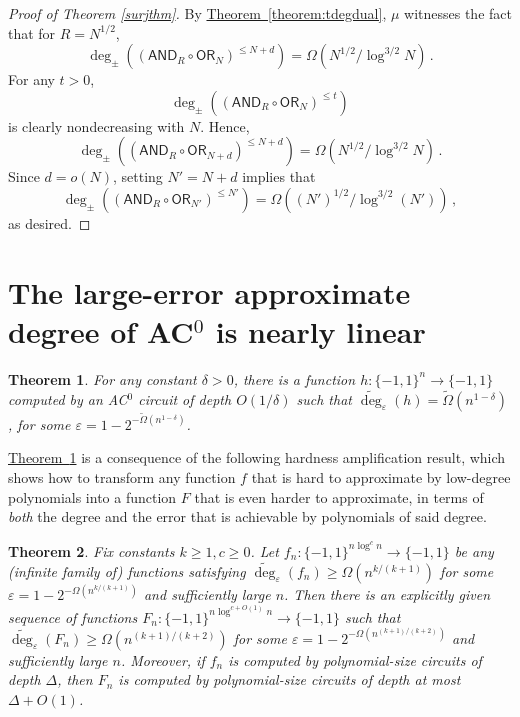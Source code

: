 \documentclass[11pt]{article}
\numberwithin{equation}{section}
\newtheorem{theorem}{Theorem}[section]
\theoremstyle{definition}
\theoremstyle{plain}
\newcommand{\expref}[2]{\hyperref[#2]{#1~\ref{#2}}}
\newcommand{\OR}{\mathsf{ OR}}
\newcommand{\bits}{\{-1,1\}}
\newcommand{\eps}{\varepsilon}
\newcommand{\adeg}{\widetilde{\operatorname{deg}}}
\newcommand{\AND}{\mathsf{AND}}
\begin{document}
\begin{proof}[Proof of Theorem \ref{surjthm}]
	By \expref{Theorem}{theorem:tdegdual}, $\mu$ witnesses the fact that for $R=N^{1/2}$,
%
%
\[\deg_{\pm}\left(\left(\AND_R \circ \OR_N\right)^{\leq N+d}\right) =
\Omega\left(N^{1/2}/\log^{3/2} N\right)\,.\]
For any $t > 0$,
%
\[ \deg_{\pm}\left(\left(\AND_R \circ \OR_N\right)^{\leq t}\right) \]
is clearly nondecreasing with $N$. Hence, 
%
%
\[ \deg_{\pm}\left(\left(\AND_R \circ \OR_{N+d}\right)^{\leq N+d}\right) = \Omega\left(N^{1/2}/\log^{3/2} N\right) \,.\]
Since $d=o(N)$, setting $N'=N+d$ implies that
%
%
\[ \deg_{\pm}\left(\left(\AND_R \circ \OR_{N'}\right)^{\leq N'}\right)
 = \Omega\left((N')^{1/2}/\log^{3/2}(N')\right)\,,\]
as desired.  %
\end{proof}

\section{The large-error approximate degree of
  \texorpdfstring{AC$^0$}{AC0} is nearly linear}
\label{s:discproof}
\begin{theorem} \label{ac0thm}
	For any constant $\delta > 0$, there is a function $h \colon \bits^n \to \bits$ computed
	by an AC$^0$ circuit of depth $O(1/\delta)$ such that $\adeg_{\eps}(h) = \tilde{\Omega}(n^{1-\delta})$,
	for some $\eps=1-2^{-\tilde{\Omega}(n^{1-\delta})}$. 
\end{theorem}

\expref{Theorem}{ac0thm} is a consequence of the following hardness amplification result, which
shows how to transform any function $f$ that is hard to approximate by low-degree polynomials
into a function $F$ that is even harder to approximate, in terms of \emph{both} the degree
and the error that is achievable by polynomials of said degree.


\begin{theorem} \label{hardnessamp}
	Fix constants $k\geq 1, c \ge 0$. Let $f_n \colon \bits^{n\log^c n} \to \bits$ be any (infinite family of) functions satisfying $\adeg_{\eps}(f_n) \geq \Omega\left(n^{k/(k+1)}\right)$
	for some $\eps=1-2^{-\Omega(n^{k/(k+1)})}$ and sufficiently large $n$. Then there is an explicitly given sequence of functions
	$F_n \colon \bits^{n \log^{c+O(1)}n} \to \bits$ such that 
	$\adeg_{\eps}(F_n) \geq \Omega\left(n^{(k+1)/(k+2)}\right)$
	for some $\eps=1-2^{-\Omega\left(n^{(k+1)/(k+2)}\right)}$ and sufficiently large $n$. Moreover,
	if $f_n$ is computed by polynomial-size %
circuits of depth %
$\Delta$, then $F_n$ is computed by 
polynomial-size %
circuits of depth at most $\Delta+O(1)$. 
\end{theorem}
\end{document}
